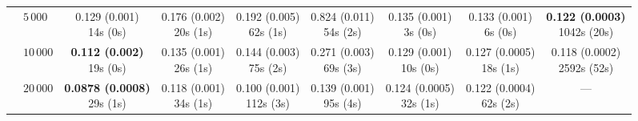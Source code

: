 \begin{table}[htbp]
{\begin{tabular}{llccccccc}
 & $5{\,}000$ & \makecell{0.129 (0.001) \\ \scriptsize 14s (0s)} & \makecell{0.176 (0.002) \\ \scriptsize 20s (1s)} & \makecell{0.192 (0.005) \\ \scriptsize 62s (1s)} & \makecell{0.824 (0.011) \\ \scriptsize 54s (2s)} & \makecell{0.135 (0.001) \\ \scriptsize 3s (0s)} & \makecell{0.133 (0.001) \\ \scriptsize 6s (0s)} & \makecell{\textbf{0.122 (0.0003)} \\ \scriptsize 1042s (20s)} \\
 & $10{\,}000$ & \makecell{\textbf{0.112 (0.002)} \\ \scriptsize 19s (0s)} & \makecell{0.135 (0.001) \\ \scriptsize 26s (1s)} & \makecell{0.144 (0.003) \\ \scriptsize 75s (2s)} & \makecell{0.271 (0.003) \\ \scriptsize 69s (3s)} & \makecell{0.129 (0.001) \\ \scriptsize 10s (0s)} & \makecell{0.127 (0.0005) \\ \scriptsize 18s (1s)} & \makecell{0.118 (0.0002) \\ \scriptsize 2592s (52s)} \\
 & $20{\,}000$ & \makecell{\textbf{0.0878 (0.0008)} \\ \scriptsize 29s (1s)} & \makecell{0.118 (0.001) \\ \scriptsize 34s (1s)} & \makecell{0.100 (0.001) \\ \scriptsize 112s (3s)} & \makecell{0.139 (0.001) \\ \scriptsize 95s (4s)} & \makecell{0.124 (0.0005) \\ \scriptsize 32s (1s)} & \makecell{0.122 (0.0004) \\ \scriptsize 62s (2s)} & --- \\
\hline
\end{tabular}%
}
\end{table}
